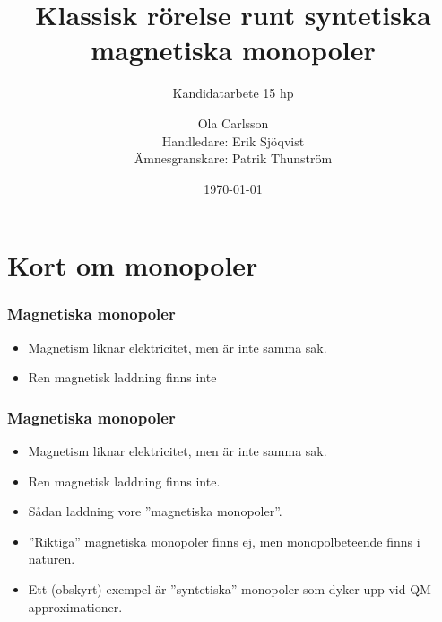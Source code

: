 \documentclass[aspectratio=169]{beamer}
\author[Ola Carlsson]{Ola Carlsson \\ Handledare: Erik
Sjöqvist \\ Ämnesgranskare: Patrik Thunström}
\title{Klassisk rörelse runt syntetiska
        magnetiska monopoler}
\subtitle{Kandidatarbete 15 hp}
\date[\today]{\today}
\institute[Institutionen för fysik och
astronomi]{Institutionen för fysik och astronomi,
Avdelningen för Materialteori}
\begin{document}
\begin{frame}[plain]
  \titlepage
\end{frame}
\section{Kort om monopoler}
\begin{frame}
  \frametitle{Magnetiska monopoler}
  \begin{itemize}
          \item Magnetism liknar elektricitet, men är
                  inte samma sak.
          \item Ren magnetisk laddning finns inte
  \end{itemize}
\end{frame}
\begin{frame}
        \begin{figure}[h]
                \centering
        \end{figure}
\end{frame}
\begin{frame}
  \frametitle{Magnetiska monopoler}
  \begin{itemize}
          \item Magnetism liknar elektricitet, men är
                  inte samma sak.
          \item Ren magnetisk laddning finns inte.
          \item Sådan laddning vore 
                  ''magnetiska monopoler''.
          \item ''Riktiga'' magnetiska monopoler finns ej,
                  men monopolbeteende finns i naturen.
          \item Ett (obskyrt) exempel är ''syntetiska''
                  monopoler som dyker upp vid
                  QM-approximationer.
  \end{itemize}
\end{frame}
\end{document}

